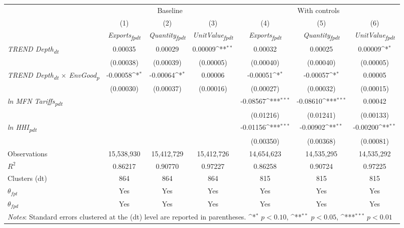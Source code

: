 {
\def\sym#1{\ifmmode^{#1}\else\(^{#1}\)\fi}
\begin{tabular}{l*{6}{c}}
\toprule
&\multicolumn{3}{c}{Baseline}&\multicolumn{3}{c}{With controls}\\\cmidrule(lr){2-4}\cmidrule(lr){5-7}
&(1)&(2)&(3)&(4)&(5)&(6)\\
&\textit{Exports\textsubscript{fpdt}}&\textit{Quantity\textsubscript{fpdt}}&\textit{UnitValue\textsubscript{fpdt}}&\textit{Exports\textsubscript{fpdt}}&\textit{Quantity\textsubscript{fpdt}}&\textit{UnitValue\textsubscript{fpdt}}\\
\midrule
\textit{TREND Depth\textsubscript{dt}} & 0.00035 & 0.00029 & 0.00009\sym{**} & 0.00032 & 0.00025 & 0.00009\sym{*}\\
 & (0.00038) & (0.00039) & (0.00005) & (0.00040) & (0.00040) & (0.00005)\\
\addlinespace
\textit{TREND Depth\textsubscript{dt} $\times$ EnvGood\textsubscript{p}} & -0.00058\sym{*} & -0.00064\sym{*} & 0.00006 & -0.00051\sym{*} & -0.00057\sym{*} & 0.00005\\
 & (0.00030) & (0.00037) & (0.00016) & (0.00027) & (0.00032) & (0.00015)\\
\addlinespace
\textit{ln MFN Tariffs\textsubscript{pdt}} &  &  &  & -0.08567\sym{***} & -0.08610\sym{***} & 0.00042\\
 &  &  &  & (0.01216) & (0.01241) & (0.00133)\\
\addlinespace
\textit{ln HHI\textsubscript{pdt}} &  &  &  & -0.01156\sym{***} & -0.00902\sym{**} & -0.00200\sym{**}\\
 &  &  &  & (0.00350) & (0.00368) & (0.00081)\\
\midrule
Observations & 15,538,930 & 15,412,729 & 15,412,726 & 14,654,623 & 14,535,295 & 14,535,292\\
$R^{2}$ & 0.86217 & 0.90770 & 0.97227 & 0.86258 & 0.90724 & 0.97225\\
Clusters (dt) & 864 & 864 & 864 & 815 & 815 & 815\\
$\theta_{fpt}$ & Yes & Yes & Yes & Yes & Yes & Yes\\
$\theta_{fpd}$ & Yes & Yes & Yes & Yes & Yes & Yes\\
\bottomrule
\multicolumn{7}{l}{\footnotesize \textit{Notes}: Standard errors clustered at the (dt) level are reported in parentheses. \sym{*} \(p<0.10\), \sym{**} \(p<0.05\), \sym{***} \(p<0.01\)}\\
\end{tabular}
}
